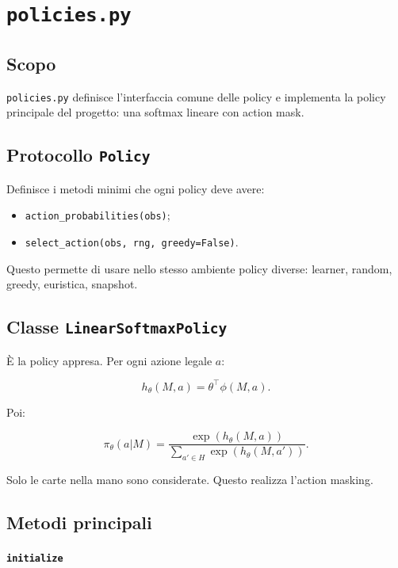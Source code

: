\documentclass[11pt,a4paper]{article}
\begin{document}
\section{\texttt{policies.py}}

\subsection{Scopo}

\texttt{policies.py} definisce l'interfaccia comune delle policy e implementa la
policy principale del progetto: una softmax lineare con action mask.

\subsection{Protocollo \texttt{Policy}}

Definisce i metodi minimi che ogni policy deve avere:

\begin{itemize}
  \item \texttt{action\_probabilities(obs)};
  \item \texttt{select\_action(obs, rng, greedy=False)}.
\end{itemize}

Questo permette di usare nello stesso ambiente policy diverse: learner, random,
greedy, euristica, snapshot.

\subsection{Classe \texttt{LinearSoftmaxPolicy}}

È la policy appresa. Per ogni azione legale \(a\):

\[
h_\theta(M,a) = \theta^\top \phi(M,a).
\]

Poi:

\[
\pi_\theta(a|M)
=
\frac{\exp(h_\theta(M,a))}
{\sum_{a'\in H}\exp(h_\theta(M,a'))}.
\]

Solo le carte nella mano sono considerate. Questo realizza l'action masking.

\subsection{Metodi principali}

\paragraph{\texttt{initialize}}
\end{document}
